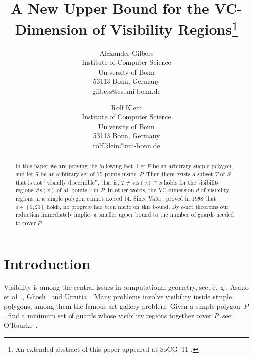 \documentclass[11pt]{article}
\begin{document}
\title{A New Upper Bound for the VC-Dimension of Visibility Regions\footnote{An extended abstract of this paper appeared at SoCG '11 \cite{gk-nubvcvr-11}.}}


\author{Alexander Gilbers\\
Institute of Computer Science\\
          University of Bonn\\
           53113 Bonn, Germany \\
           gilbers@cs.uni-bonn.de
       \and Rolf Klein\\
       Institute of Computer Science\\
          University of Bonn\\
           53113 Bonn, Germany \\
           rolf.klein@uni-bonn.de
       }

\maketitle

\begin{abstract}
In this paper we are proving the following fact.
Let $P$ be an arbitrary simple polygon, and let $S$ be an arbitrary set of 15 points inside~$P$.
Then there exists a subset $T$ of $S$ that is not ``visually discernible'', that is, 
$T \not=\mbox{vis}(v) \cap S$ holds for the visibility regions $\mbox{vis}(v)$ of all points $v$ in $P$.
In other words, the VC-dimension $d$  of visibility regions in a simple polygon cannot exceed $14$.
Since Valtr~\cite{v-ggwps-98} proved in 1998 that $d \in [6,23]$ holds, 
no progress has been made on this bound.
By $\epsilon$-net theorems our reduction immediately implies a smaller upper bound to the number of guards
needed to cover $P$.
\end{abstract}






\section{Introduction}  

Visibility is among the central issues in computational geometry, see, e.~g., 
Asano et al.~\cite{ags-vip-00}, Ghosh~\cite{g-vap-07} and Urrutia~\cite{u-agip-00}.
Many problems involve visibility inside simple polygons,
among them the famous art gallery problem: Given a simple polygon~$P$, find a minimum set of 
guards whose visibility regions together cover $P$; see O'Rourke~\cite{r-agta-87}. 
\end{document}
